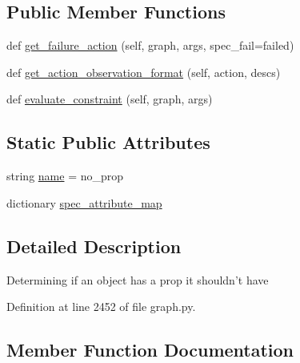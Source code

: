 \subsection*{Public Member Functions}
\begin{DoxyCompactItemize}
\item 
def \hyperlink{classlight__chats_1_1graph_1_1NoPropConstraint_ad9fd1275af02f384bd55ceaebc6ee59c}{get\+\_\+failure\+\_\+action} (self, graph, args, spec\+\_\+fail=\textquotesingle{}failed\textquotesingle{})
\item 
def \hyperlink{classlight__chats_1_1graph_1_1NoPropConstraint_a7d3ef98c6d1eea452e44c426a9498015}{get\+\_\+action\+\_\+observation\+\_\+format} (self, action, descs)
\item 
def \hyperlink{classlight__chats_1_1graph_1_1NoPropConstraint_a9a109d3e7b10297b01d79409838be126}{evaluate\+\_\+constraint} (self, graph, args)
\end{DoxyCompactItemize}
\subsection*{Static Public Attributes}
\begin{DoxyCompactItemize}
\item 
string \hyperlink{classlight__chats_1_1graph_1_1NoPropConstraint_a73cef897b375d0070ea5979c44e3b685}{name} = \textquotesingle{}no\+\_\+prop\textquotesingle{}
\item 
dictionary \hyperlink{classlight__chats_1_1graph_1_1NoPropConstraint_a522735936f15f8478d82d594802c99d4}{spec\+\_\+attribute\+\_\+map}
\end{DoxyCompactItemize}


\subsection{Detailed Description}
\begin{DoxyVerb}Determining if an object has a prop it shouldn't have\end{DoxyVerb}
 

Definition at line 2452 of file graph.\+py.



\subsection{Member Function Documentation}
\mbox{\label{classlight__chats_1_1graph_1_1NoPropConstraint_a9a109d3e7b10297b01d79409838be126}} 
